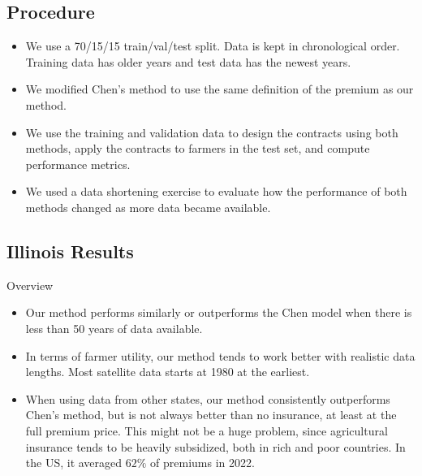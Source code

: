 \documentclass{beamer}
\begin{document}
\subsection{Procedure}
\begin{frame}
    \begin{itemize}
        \setlength\itemsep{2em}
        \item We use a 70/15/15 train/val/test split. Data is kept in chronological order. Training data has older years and test data has the newest years. 
        \item We modified Chen's method to use the same definition of the premium as our method. 
        \item We use the training and validation data to design the contracts using both methods, apply the contracts to farmers in the test set, and compute performance metrics. 
        \item We used a data shortening exercise to evaluate how the performance of both methods changed as more data became available. 
    \end{itemize}
\end{frame}


\subsection*{Illinois Results}
\begin{frame}{Overview}
    \begin{itemize}
        \setlength\itemsep{2em}
        \item Our method performs similarly or outperforms the Chen model when there is less than 50 years of data available.  
        \item In terms of farmer utility, our method tends to work better with realistic data lengths. Most satellite data starts at 1980 at the earliest. 
        \item When using data from other states, our method consistently outperforms Chen's method, but is not always better than no insurance, at least at the full premium price. This might not be a huge problem, since agricultural insurance tends to be heavily subsidized, both in rich and poor countries. In the US, it averaged $62\%$ of premiums in 2022. 
    \end{itemize}
\end{frame}
\end{document}
